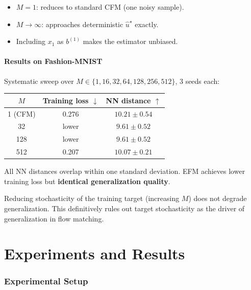 \documentclass[11pt, a4paper]{article}
\theoremstyle{plain}
\theoremstyle{definition}
\theoremstyle{remark}
\begin{document}
\begin{itemize}
  \item $M=1$: reduces to standard CFM (one noisy sample).
  \item $M \to \infty$: approaches deterministic $\hat{u}^\star$ exactly.
  \item Including $x_1$ as $b^{(1)}$ makes the estimator unbiased.
\end{itemize}

\subsection{Results on Fashion-MNIST}

Systematic sweep over $M \in \{1, 16, 32, 64, 128, 256, 512\}$, 3 seeds each:

\begin{center}
\begin{tabular}{ccc}
\toprule
$M$ & Training loss $\downarrow$ & NN distance $\uparrow$ \\
\midrule
1 (CFM) & 0.276 & $10.21 \pm 0.54$ \\
32      & lower & $9.61 \pm 0.52$ \\
128     & lower & $9.61 \pm 0.52$ \\
512     & 0.207 & $10.07 \pm 0.21$ \\
\bottomrule
\end{tabular}
\end{center}

All NN distances overlap within one standard deviation. EFM achieves lower training loss but \textbf{identical generalization quality}.

\begin{keybox}
Reducing stochasticity of the training target (increasing $M$) does not degrade generalization. This definitively rules out target stochasticity as the driver of generalization in flow matching.
\end{keybox}

\part{Experiments and Results}

\section{Experimental Setup}
\label{sec:setup}
\end{document}
